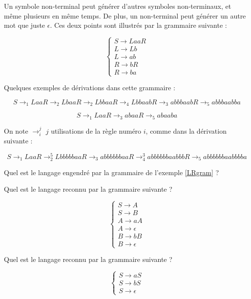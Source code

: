 \begin{example}
\label{LRgram}
Un symbole non-terminal peut générer d'autres symboles non-terminaux, et même plusieurs en même temps. De plus, un non-terminal peut générer un autre mot que juste $\epsilon$. Ces deux points sont illustrés par la grammaire suivante :

\[
\begin{cases}
S \rightarrow LaaR \\
L \rightarrow Lb \\
L \rightarrow ab \\
R \rightarrow bR \\
R \rightarrow ba
\end{cases}
\]

Quelques exemples de dérivations dans cette grammaire :

\[
 S \rightarrow_1 LaaR \rightarrow_2 LbaaR \rightarrow_2 LbbaaR \rightarrow_4 LbbaabR \rightarrow_3 abbbaabR \rightarrow_5 abbbaabba
\]

\[
 S \rightarrow_1 LaaR \rightarrow_3 abaaR \rightarrow_5 abaaba
 \]
 
 On note $\rightarrow_i^j$ $j$ utilisations de la règle numéro $i$, comme dans la dérivation suivante :
 
 \[
 S \rightarrow_1 LaaR \rightarrow_2^5 LbbbbbaaR \rightarrow_3 abbbbbbaaR \rightarrow_4^3 abbbbbbaabbbR \rightarrow_5 abbbbbbaabbbba
 \]

\end{example}

\begin{exercice}
Quel est le langage engendré par la grammaire de l'exemple \ref{LRgram} ?
\end{exercice}

\begin{exercice}
\label{grammab}
Quel est le langage reconnu par la grammaire suivante ?

\[
\begin{cases}
S \rightarrow A \\
S \rightarrow B \\
A \rightarrow aA \\
A \rightarrow \epsilon \\
B \rightarrow bB \\
B \rightarrow \epsilon
\end{cases}
\]

\end{exercice}

\begin{exercice}
\label{grammsigma}
Quel est le langage reconnu par la grammaire suivante ?

\[
\begin{cases}
S \rightarrow aS \\
S \rightarrow bS \\
S \rightarrow \epsilon 
\end{cases}
\]

\end{exercice}


